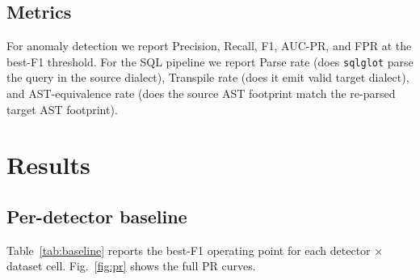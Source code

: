 \documentclass{ieeeaccess}
\begin{document}
\subsection{Metrics}
For anomaly detection we report Precision, Recall, F1, AUC-PR, and FPR at the best-F1 threshold. For
the SQL pipeline we report Parse rate (does \texttt{sqlglot} parse the query in the source dialect),
Transpile rate (does it emit valid target dialect), and AST-equivalence rate (does the source AST
footprint match the re-parsed target AST footprint).

\section{Results}
\label{sec:results}

\subsection{Per-detector baseline}
Table~\ref{tab:baseline} reports the best-F1 operating point for each detector $\times$ dataset cell.
Fig.~\ref{fig:pr} shows the full PR curves.
\end{document}
